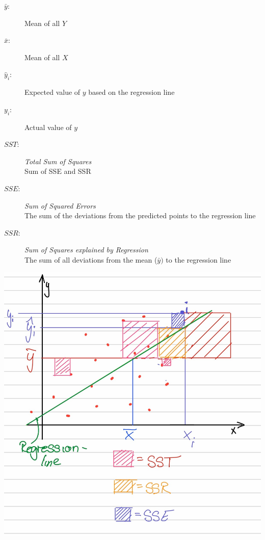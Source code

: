 \documentclass[11pt]{article}
\begin{document}
\begin{minipage}{0.4\textwidth}
    \begin{description}
        \item[$\bar y$:] Mean of all $Y$
        \item[$\bar x$:] Mean of all $X$
        \item[$\hat y_{i}$:] Expected value of $y$ based on the regression line
        \item[$y_{i}$:] Actual value of $y$
        \item[$SST:$] \textit{Total Sum of Squares} \\
              Sum of SSE and SSR
        \item[$SSE:$ ] \textit{Sum of Squared Errors} \\
              The sum of the deviations from the predicted points to the regression line
        \item[$SSR:$ ] \textit{Sum of Squares explained by Regression} \\
              The sum of all deviations from the mean ($\bar y)$ to the regression line
    \end{description}
\end{minipage} \hfill
\begin{minipage}{0.6\textwidth}
    \includegraphics[keepaspectratio=true,width=\textwidth]{SST.JPG}
\end{minipage}
\end{document}
